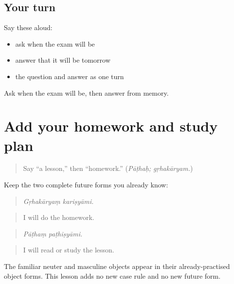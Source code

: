 \subsection*{Your turn}
Say these aloud:

\begin{itemize}
\raggedright
  \item ask when the exam will be
  \item answer that it will be tomorrow
  \item the question and answer as one turn
\end{itemize}

\begin{tcolorbox}[breakable,colback=teal!4,colframe=teal!35!black,title={Before you move on}]
Ask when the exam will be, then answer from memory.
\end{tcolorbox}
\section[(one homework and study plan)]{Add your homework and study plan}

\label{lesson:SA-C267-homework-plan}



\begin{quote}
Say “a lesson,” then “homework.” (\emph{Pāṭhaḥ; gṛhakāryam.})
\end{quote}

\begin{grammarlens}[title={Grammar Lens: known forms, new schoolwork}]
Keep the two complete future forms you already know:

\begin{quote}
\textbf{ }
\end{quote}

\begin{quote}
\emph{Gṛhakāryaṃ kariṣyāmi.}
\end{quote}

\begin{quote}
I will do the homework.
\end{quote}

\begin{quote}
\textbf{ }
\end{quote}

\begin{quote}
\emph{Pāṭhaṃ paṭhiṣyāmi.}
\end{quote}

\begin{quote}
I will read or study the lesson.
\end{quote}

The familiar neuter and masculine objects appear in their already-practised object forms. This lesson adds no new case rule and no new future form.
\end{grammarlens}

